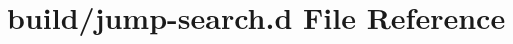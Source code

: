 \hypertarget{jump-search_8d}{}\section{build/jump-\/search.d File Reference}
\label{jump-search_8d}

